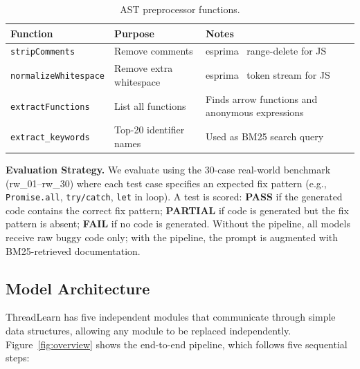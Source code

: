 \documentclass[runningheads]{llncs}
\begin{document}
\begin{table}[H]
  \centering
  \caption{AST preprocessor functions.}
  \label{tab:ast}
  \begin{tabular}{@{}llp{5cm}@{}}
    \toprule
    \textbf{Function} & \textbf{Purpose} & \textbf{Notes} \\
    \midrule
    \texttt{stripComments}       & Remove comments        & esprima~\cite{esprima} range-delete for JS \\
    \texttt{normalizeWhitespace} & Remove extra whitespace & esprima~\cite{esprima} token stream for JS \\
    \texttt{extractFunctions}    & List all functions     & Finds arrow functions and anonymous expressions \\
    \texttt{extract\_keywords}   & Top-20 identifier names & Used as BM25 search query \\
    \bottomrule
  \end{tabular}
\end{table}

\textbf{Evaluation Strategy.}
We evaluate using the 30-case real-world benchmark (rw\_01--rw\_30)
where each test case specifies an expected fix pattern
(e.g., \texttt{Promise.all}, \texttt{try/catch}, \texttt{let} in loop).
A test is scored:
\textbf{PASS} if the generated code contains the correct fix pattern;
\textbf{PARTIAL} if code is generated but the fix pattern is absent;
\textbf{FAIL} if no code is generated.
Without the pipeline, all models receive raw buggy code only;
with the pipeline, the prompt is augmented with BM25-retrieved documentation.

\subsection{Model Architecture}
\label{sec:design:arch}

ThreadLearn has five independent modules that communicate through simple
data structures, allowing any module to be replaced independently.
Figure~\ref{fig:overview} shows the end-to-end pipeline, which follows
five sequential steps:
\end{document}

